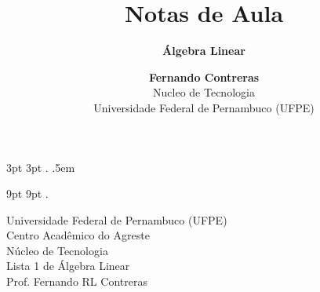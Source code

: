 \theoremstyle{note}
\newtheorem{note}{Note}

  {3pt}%
  {3pt}%
  {\itshape}%
  {}%
  {\bfseries}%
  {.}%
  {.5em}%
  {}%

\theoremstyle{citing}
\newtheorem*{varthm}{}%

  {9pt}%
  {9pt}%
  {\itshape}%
  {}%
  {\bfseries}%
  {.}%
  {\newline}%
  {}%

\theoremstyle{break}
\newtheorem{bthm}{B-Theorem}

\theoremstyle{exercise}
\newtheorem{exer}{Exercise}

\swapnumbers
\theoremstyle{plain}
\newtheorem{thmsw}{Theorem}[section]
\newtheorem{propsw}{Proposition}

\let\lvert=|\let\rvert=|
\newcommand{\Ric}{\mathop{\mathrm{Ric}}\nolimits}

\addtolength{\textwidth}{8pt}

\title{ \textbf{Notas de Aula}}
\subtitle{\textbf{Álgebra Linear}}
\author{\textbf{Fernando Contreras}\\
	\large Nucleo de Tecnologia\\
	Universidade Federal de Pernambuco (UFPE)}




	\begin{center}
		Universidade Federal de Pernambuco (UFPE)\\
		Centro Acadêmico do Agreste\\
		Núcleo de Tecnologia\\
		
		Lista 1 de Álgebra Linear\\
		Prof. Fernando RL Contreras
	\end{center}


